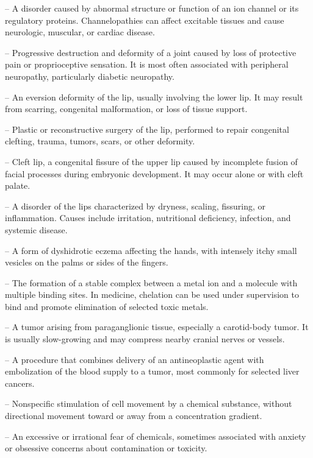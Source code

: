 -- A disorder caused by abnormal structure or function of an ion channel or its regulatory proteins. Channelopathies can affect excitable tissues and cause neurologic, muscular, or cardiac disease.

-- Progressive destruction and deformity of a joint caused by loss of protective pain or proprioceptive sensation. It is most often associated with peripheral neuropathy, particularly diabetic neuropathy.

-- An eversion deformity of the lip, usually involving the lower lip. It may result from scarring, congenital malformation, or loss of tissue support.

-- Plastic or reconstructive surgery of the lip, performed to repair congenital clefting, trauma, tumors, scars, or other deformity.

-- Cleft lip, a congenital fissure of the upper lip caused by incomplete fusion of facial processes during embryonic development. It may occur alone or with cleft palate.

-- A disorder of the lips characterized by dryness, scaling, fissuring, or inflammation. Causes include irritation, nutritional deficiency, infection, and systemic disease.

-- A form of dyshidrotic eczema affecting the hands, with intensely itchy small vesicles on the palms or sides of the fingers.

-- The formation of a stable complex between a metal ion and a molecule with multiple binding sites. In medicine, chelation can be used under supervision to bind and promote elimination of selected toxic metals.

-- A tumor arising from paraganglionic tissue, especially a carotid-body tumor. It is usually slow-growing and may compress nearby cranial nerves or vessels.

-- A procedure that combines delivery of an antineoplastic agent with embolization of the blood supply to a tumor, most commonly for selected liver cancers.

-- Nonspecific stimulation of cell movement by a chemical substance, without directional movement toward or away from a concentration gradient.

-- An excessive or irrational fear of chemicals, sometimes associated with anxiety or obsessive concerns about contamination or toxicity.

